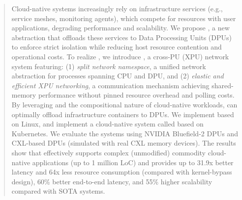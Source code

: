 \begin{abstract}

Cloud-native systems increasingly rely on infrastructure services (e.g., service meshes, monitoring agents), which compete for resources with user applications, degrading performance and scalability.
We propose \xpod, a new abstraction that offloads these services to Data Processing Units (DPUs) to enforce strict isolation while reducing host resource contention and operational costs.
To realize \xpod, we introduce \os, a cross-PU (XPU) network system featuring: (1) \emph{split network namespace}, a unified network abstraction for processes spanning CPU and DPU,
and (2) \emph{elastic and efficient XPU networking}, a communication mechanism achieving shared-memory performance without pinned resource overhead and polling costs.
By leveraging \os and the compositional nature of cloud-native workloads, \xpod can optimally offload infrastructure containers to DPUs.
We implement \os based on Linux, and implement a cloud-native system called \sys based on Kubernetes.
We evaluate the systems using NVIDIA Bluefield-2 DPUs and CXL-based DPUs (simulated with real CXL memory devices).
The results show that \sys effectively supports complex (unmodified) commodity cloud-native applications (up to 1 million LoC) and provides up to 31.9x better latency and 64x less resource consumption (compared with kernel-bypass design), 60\% better end-to-end latency, and 55\% higher scalability compared with SOTA systems.

\end{abstract}


